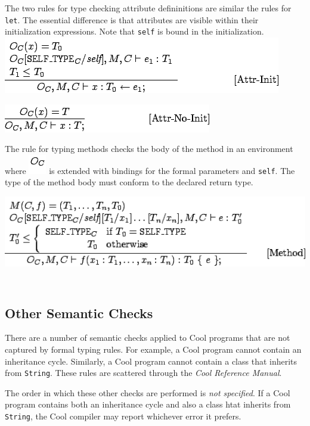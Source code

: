 \documentclass[]{article}
\begin{document}
The two rules for type checking attribute defininitions are similar the
rules for \texttt{let}. The essential difference is that attributes are
visible within their initialization expressions. Note that \texttt{self}
is bound in the initialization. \\

\includegraphics{img112.png}

\includegraphics{img113.png}

The rule for typing methods checks the body of the method in an
environment where \includegraphics{img109.png} is extended with bindings
for the formal parameters and \texttt{self}. The type of the method body
must conform to the declared return type.

\includegraphics{img114.png}

\subsection{\\ Other Semantic Checks}

There are a number of semantic checks applied to Cool programs that are
not captured by formal typing rules. For example, a Cool program cannot
contain an inheritance cycle. Similarly, a Cool program cannot contain a
class that inherits from \texttt{String}. These rules are scattered
through the \emph{Cool Reference Manual}.

The order in which these other checks are performed is \emph{not
specified}. If a Cool program contains both an inheritance cycle and
also a class htat inherits from \texttt{String}, the Cool compiler may
report whichever error it prefers.
\end{document}
